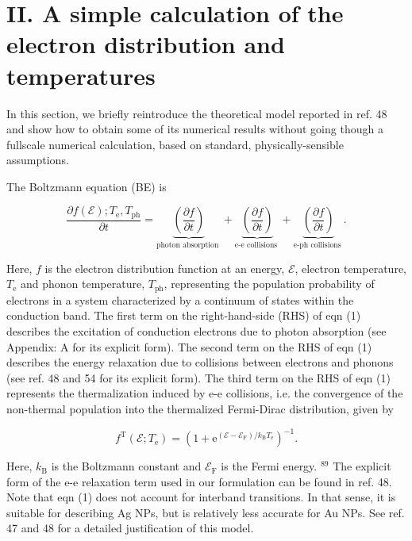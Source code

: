 \documentclass[10pt]{article}
\begin{document}
\section*{II. A simple calculation of the electron distribution and temperatures}
In this section, we briefly reintroduce the theoretical model reported in ref. 48 and show how to obtain some of its numerical results without going though a fullscale numerical calculation, based on standard, physically-sensible assumptions.

The Boltzmann equation (BE) is


\begin{equation*}
\frac{\partial f(\mathcal{E}) ; T_{\mathrm{e}}, T_{\mathrm{ph}}}{\partial t}=\underbrace{\left(\frac{\partial f}{\partial t}\right)}_{\text {photon absorption }}+\underbrace{\left(\frac{\partial f}{\partial t}\right)}_{\text {e-e collisions }}+\underbrace{\left(\frac{\partial f}{\partial t}\right)}_{\text {e-ph collisions }} . \tag{1}
\end{equation*}


Here, $f$ is the electron distribution function at an energy, $\mathcal{E}$, electron temperature, $T_{\mathrm{e}}$ and phonon temperature, $T_{\mathrm{ph}}$, representing the population probability of\\
electrons in a system characterized by a continuum of states within the conduction band. The first term on the right-hand-side (RHS) of eqn (1) describes the excitation of conduction electrons due to photon absorption (see Appendix: A for its explicit form). The second term on the RHS of eqn (1) describes the energy relaxation due to collisions between electrons and phonons (see ref. 48 and 54 for its explicit form). The third term on the RHS of eqn (1) represents the thermalization induced by e-e collisions, i.e. the convergence of the non-thermal population into the thermalized Fermi-Dirac distribution, given by


\begin{equation*}
f^{\mathrm{T}}\left(\mathcal{E} ; T_{\mathrm{e}}\right)=\left(1+\mathrm{e}^{\left(\mathcal{E}-\mathcal{E}_{\mathrm{F}}\right) / k_{\mathrm{B}} T_{\mathrm{e}}}\right)^{-1} . \tag{2}
\end{equation*}


Here, $k_{\mathrm{B}}$ is the Boltzmann constant and $\mathcal{E}_{\mathrm{F}}$ is the Fermi energy. ${ }^{89}$ The explicit form of the e-e relaxation term used in our formulation can be found in ref. 48. Note that eqn (1) does not account for interband transitions. In that sense, it is suitable for describing Ag NPs, but is relatively less accurate for Au NPs. See ref. 47 and 48 for a detailed justification of this model.
\end{document}
